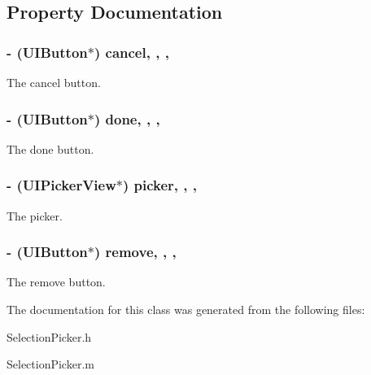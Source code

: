 \subsection{Property Documentation}
\hypertarget{interface_selection_picker_ad419e9278ed75268dda0e48c5ce43822}{
\subsubsection[{cancel}]{\setlength{\rightskip}{0pt plus 5cm}-\/ (U\+I\+Button$\ast$) cancel\hspace{0.3cm}{\ttfamily [read]}, {\ttfamily [write]}, {\ttfamily [nonatomic]}, {\ttfamily [weak]}}}\label{interface_selection_picker_ad419e9278ed75268dda0e48c5ce43822}
The cancel button. \hypertarget{interface_selection_picker_aa43b12e68fd0c7c20745380fc60b6b88}{
\subsubsection[{done}]{\setlength{\rightskip}{0pt plus 5cm}-\/ (U\+I\+Button$\ast$) done\hspace{0.3cm}{\ttfamily [read]}, {\ttfamily [write]}, {\ttfamily [nonatomic]}, {\ttfamily [weak]}}}\label{interface_selection_picker_aa43b12e68fd0c7c20745380fc60b6b88}
The done button. \hypertarget{interface_selection_picker_aa2a3f2d050d8e454ee7158ab17735c5f}{
\subsubsection[{picker}]{\setlength{\rightskip}{0pt plus 5cm}-\/ (U\+I\+Picker\+View$\ast$) picker\hspace{0.3cm}{\ttfamily [read]}, {\ttfamily [write]}, {\ttfamily [nonatomic]}, {\ttfamily [weak]}}}\label{interface_selection_picker_aa2a3f2d050d8e454ee7158ab17735c5f}
The picker. \hypertarget{interface_selection_picker_a060c08f65fc47029ed1902e796a03925}{
\subsubsection[{remove}]{\setlength{\rightskip}{0pt plus 5cm}-\/ (U\+I\+Button$\ast$) remove\hspace{0.3cm}{\ttfamily [read]}, {\ttfamily [write]}, {\ttfamily [nonatomic]}, {\ttfamily [weak]}}}\label{interface_selection_picker_a060c08f65fc47029ed1902e796a03925}
The remove button. 

The documentation for this class was generated from the following files\+:\begin{DoxyCompactItemize}
\item 
Selection\+Picker.\+h\item 
Selection\+Picker.\+m\end{DoxyCompactItemize}
